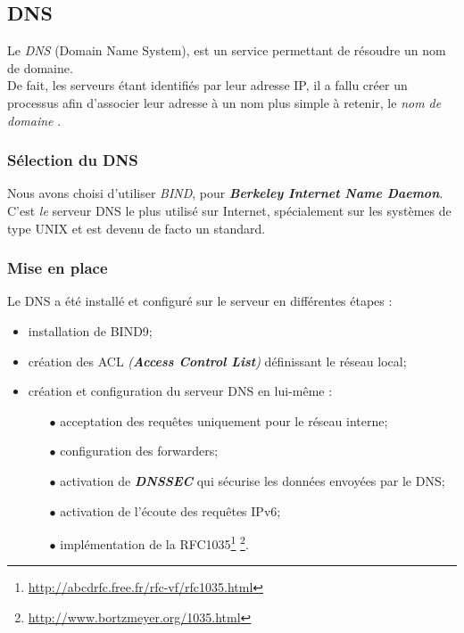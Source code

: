 \subsection{DNS}
\label{subsec:dns}

Le \emph{DNS} (Domain Name System), est un service permettant de résoudre un nom
de domaine. \\ De fait, les serveurs étant identifiés par leur adresse IP, il a
fallu créer un processus afin d'associer leur adresse à un nom plus simple à
retenir, le \og \textit{nom de domaine} \fg.

\subsubsection{Sélection du DNS}
\label{subsubsec:selection-dns}

Nous avons choisi d'utiliser \emph{BIND}, pour \textit{\textbf{Berkeley
Internet Name Daemon}}. \\
C'est \textit{le} serveur DNS le plus utilisé sur Internet, spécialement sur les
systèmes de type UNIX et est devenu de facto un standard.


\subsubsection{Mise en place}
\label{subsubsec:miseen-place}

Le DNS a été installé et configuré sur le serveur en différentes étapes :

\begin{itemize}
    \item installation de BIND9;
    \item création des ACL \textit{(\textbf{Access Control List})}
    définissant le réseau local;
    \item création et configuration du serveur DNS en lui-même :
    \begin{itemize}
        \item[$\bullet$] acceptation des requêtes uniquement pour le réseau interne;
        \item[$\bullet$] configuration des forwarders;
        \item[$\bullet$] activation de \textit{\textbf{DNSSEC}} qui sécurise les
        données envoyées par le DNS;
        \item[$\bullet$] activation de l'écoute des requêtes IPv6;
        \item[$\bullet$] implémentation de la
        RFC1035\footnote{\url{http://abcdrfc.free.fr/rfc-vf/rfc1035.html}}
        \footnote{\url{http://www.bortzmeyer.org/1035.html}}. \\
    \end{itemize}
\end{itemize}

